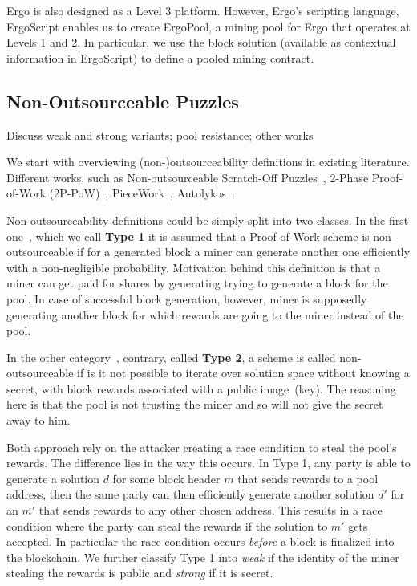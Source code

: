 \documentclass[11pt]{article}
\newcommand{\langname}{ErgoScript\xspace}
\newcommand{\poolname}{ErgoPool\xspace}
\begin{document}
Ergo is also designed as a Level 3 platform. However, Ergo's scripting language, \langname enables us to create \poolname, a mining pool for Ergo that operates at Levels 1 and 2. In particular, we use the block solution (available as contextual information in \langname) to define a pooled mining contract.

\subsection{Non-Outsourceable Puzzles}

Discuss weak and strong variants; pool resistance; other works

We start with overviewing (non-)outsourceability definitions in existing literature. Different works, such as
Non-outsourceable Scratch-Off Puzzles~\cite{miller2015nonoutsourceable}, 2-Phase Proof-of-Work (2P-PoW)~\cite{twophase},
PieceWork~\cite{daian2017short}, Autolykos~\cite{autolykos}.


Non-outsourceability definitions could be simply split into two classes. In the first one~\cite{miller2015nonoutsourceable}, which we call \textbf{Type 1} it is assumed that a Proof-of-Work scheme is non-outsourceable if for a generated block a miner can generate another one
efficiently with a non-negligible probability. Motivation behind this definition is that a miner can get paid for shares
by generating trying to generate a block for the pool. In case of successful block generation, however, miner is supposedly generating
another block for which rewards are going to the miner instead of the pool. 

In the other category~\cite{autolykos, daian2017short, twophase}, contrary, called \textbf{Type 2}, a scheme is called
non-outsourceable if is it not possible to iterate over solution space without knowing a secret, with block rewards
associated with a public image~(key). The reasoning here is that the pool is not trusting the miner and so will not give
the secret away to him.  

Both approach rely on the attacker creating a race condition to steal the pool's rewards. The difference lies in the way this occurs. In Type 1, any party is able to generate a solution $d$ for some block header $m$ that sends rewards to a pool address, then the same party can then efficiently generate another solution $d'$ for an $m'$ that sends rewards to any other chosen address. This results in a race condition where the party can steal the rewards if the solution to $m'$ gets accepted. In particular the race condition occurs {\em before} a block is finalized into the blockchain. We further classify Type 1 into {\em weak} if the identity of the miner stealing the rewards is public and {\em strong} if it is secret. 
\end{document}
